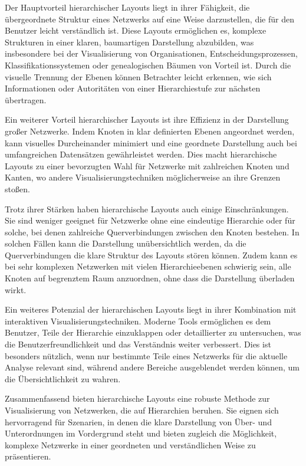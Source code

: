 Der Hauptvorteil hierarchischer Layouts liegt in ihrer Fähigkeit, die übergeordnete Struktur eines Netzwerks auf eine Weise darzustellen, die für den Benutzer leicht verständlich ist. Diese Layouts ermöglichen es, komplexe Strukturen in einer klaren, baumartigen Darstellung abzubilden, was insbesondere bei der Visualisierung von Organisationen, Entscheidungsprozessen, Klassifikationssystemen oder genealogischen Bäumen von Vorteil ist. Durch die visuelle Trennung der Ebenen können Betrachter leicht erkennen, wie sich Informationen oder Autoritäten von einer Hierarchiestufe zur nächsten übertragen.

Ein weiterer Vorteil hierarchischer Layouts ist ihre Effizienz in der Darstellung großer Netzwerke. Indem Knoten in klar definierten Ebenen angeordnet werden, kann visuelles Durcheinander minimiert und eine geordnete Darstellung auch bei umfangreichen Datensätzen gewährleistet werden. Dies macht hierarchische Layouts zu einer bevorzugten Wahl für Netzwerke mit zahlreichen Knoten und Kanten, wo andere Visualisierungstechniken möglicherweise an ihre Grenzen stoßen.

Trotz ihrer Stärken haben hierarchische Layouts auch einige Einschränkungen. Sie sind weniger geeignet für Netzwerke ohne eine eindeutige Hierarchie oder für solche, bei denen zahlreiche Querverbindungen zwischen den Knoten bestehen. In solchen Fällen kann die Darstellung unübersichtlich werden, da die Querverbindungen die klare Struktur des Layouts stören können. Zudem kann es bei sehr komplexen Netzwerken mit vielen Hierarchieebenen schwierig sein, alle Knoten auf begrenztem Raum anzuordnen, ohne dass die Darstellung überladen wirkt.

Ein weiteres Potenzial der hierarchischen Layouts liegt in ihrer Kombination mit interaktiven Visualisierungstechniken. Moderne Tools ermöglichen es dem Benutzer, Teile der Hierarchie einzuklappen oder detaillierter zu untersuchen, was die Benutzerfreundlichkeit und das Verständnis weiter verbessert. Dies ist besonders nützlich, wenn nur bestimmte Teile eines Netzwerks für die aktuelle Analyse relevant sind, während andere Bereiche ausgeblendet werden können, um die Übersichtlichkeit zu wahren.

Zusammenfassend bieten hierarchische Layouts eine robuste Methode zur Visualisierung von Netzwerken, die auf Hierarchien beruhen. Sie eignen sich hervorragend für Szenarien, in denen die klare Darstellung von Über- und Unterordnungen im Vordergrund steht und bieten zugleich die Möglichkeit, komplexe Netzwerke in einer geordneten und verständlichen Weise zu präsentieren.

